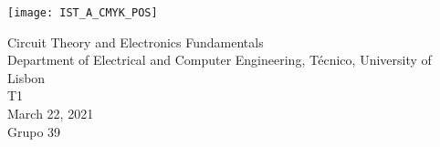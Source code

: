 
\thispagestyle {empty}

\texttt{[image: IST\_A\_CMYK\_POS]}


\begin{center}
  \vspace{1.0cm}

  \vspace{1cm}
  {\FontLb Circuit Theory and Electronics Fundamentals} \\ %
  \vspace{1cm}
  {\FontSn Department of Electrical and Computer Engineering, Técnico, University of Lisbon} \\ %
  \vspace{1cm}
  {\FontSn T1} \\
  \vspace{1cm}
  {\FontSn March 22, 2021} \\
  {\FontSn Grupo 39}
\end{center}

